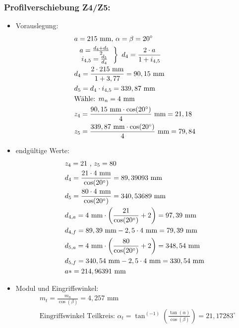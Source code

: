 \subsubsection{Profilverschiebung Z4/Z5:}
\begin{itemize}
\item Vorauslegung:
\begin{align*}
	&a= 215 \text{ mm, } \alpha = \beta = 20^\circ \\
	&\left. \begin{array}{c} a= \frac{d_4 + d_5}{2}\\i_{4,5} = \frac{d_5}{d_4} \end{array} \right\} \text{ }d_4 = \frac{2 \cdot a}{1+i_{4,5}} \\
	&d_4 = \frac{2\cdot 215 \text{ mm}}{1+3,77} = 90,15\text{ mm} \\
	&d_5 = d_4 \cdot i_{4,5} = 339,87 \text{ mm}\\
	&\text{Wähle: }m_n = 4 \text{ mm} \\
	&z_4 = \frac{90,15 \text{ mm} \cdot \cos(20^\circ)}{4 } \text{ mm} = 21,18\\
	&z_5 = \frac{339,87 \text{ mm} \cdot \cos(20^\circ)}{4 } \text{ mm} = 79,84
\end{align*}
\item endgültige Werte:
\begin{align*}
	&z_4 = 21 \text{ , } z_5 = 80 \\
	&d_4 = \frac{21 \cdot 4\text{ mm} }{\cos(20^\circ)} = 89,39093 \text{ mm} \\
	&d_5 = \frac{80\cdot 4\text{ mm} }{\cos(20^\circ)} = 340,53689 \text{ mm} \\
	&d_{4,a} = 4\text{ mm} \cdot \left(\frac{21}{\cos(20^\circ)}+2\right) =97,39\text{ mm} \\
	&d_{4,f} = 89,39\text{ mm} -2,5 \cdot 4\text{ mm} =79,39\text{ mm} \\
	&d_{5,a} = 4\text{ mm} \cdot \left(\frac{80}{\cos(20^\circ)}+2\right) =348,54\text{ mm} \\
	&d_{5,f} = 340,54\text{ mm} -2,5 \cdot 4\text{ mm} =330,54\text{ mm} \\
	&a* = 214,96391 \text{ mm} 
\end{align*}
\item Modul und Eingriffswinkel:
\begin{align*}
	&m_t = \frac{m_n}{\cos(\beta)} = 4,257\text{ mm} \\
	&\text{Eingriffswinkel Teilkreis: } \alpha_t = \tan^{(-1)} \left( \frac{\tan(\alpha)}{\cos(\beta)} \right) = 21,17283 ^\circ \\

\end{align*}
\end{itemize}
